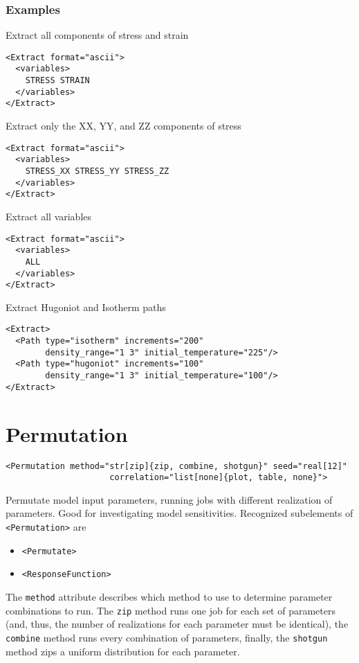 \documentclass[11pt]{report}
\renewcommand{\tag}[1]{\texttt{<#1>}}
\begin{document}
\subsubsection{Examples}
Extract all components of stress and strain
%
\begin{verbatim}
<Extract format="ascii">
  <variables>
    STRESS STRAIN
  </variables>
</Extract>
\end{verbatim}

Extract only the XX, YY, and ZZ components of stress
%
\begin{verbatim}
<Extract format="ascii">
  <variables>
    STRESS_XX STRESS_YY STRESS_ZZ
  </variables>
</Extract>
\end{verbatim}

Extract all variables
\begin{verbatim}
<Extract format="ascii">
  <variables>
    ALL
  </variables>
</Extract>
\end{verbatim}

Extract Hugoniot and Isotherm paths
\begin{verbatim}
<Extract>
  <Path type="isotherm" increments="200"
        density_range="1 3" initial_temperature="225"/>
  <Path type="hugoniot" increments="100"
        density_range="1 3" initial_temperature="100"/>
</Extract>
\end{verbatim}

\section{Permutation}
\begin{verbatim}
<Permutation method="str[zip]{zip, combine, shotgun}" seed="real[12]"
                     correlation="list[none]{plot, table, none}">
\end{verbatim}
%
Permutate model input parameters, running jobs with different realization of
parameters. Good for investigating model sensitivities. Recognized subelements
of \tag{Permutation} are

\begin{itemize}
  \item \tag{Permutate}
  \item \tag{ResponseFunction}
\end{itemize}

The \texttt{method} attribute describes which method to use to determine
parameter combinations to run.  The \texttt{zip} method runs one job for each
set of parameters (and, thus, the number of realizations for each parameter
must be identical), the \texttt{combine} method runs every combination of
parameters, finally, the \texttt{shotgun} method zips a uniform distribution
for each parameter.
\end{document}
